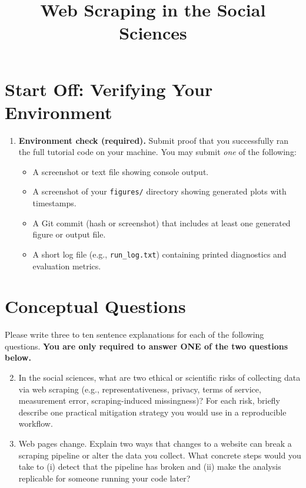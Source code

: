 \documentclass[11pt]{article}
\title{ Web Scraping in the Social Sciences}
\author{ }
\date{ }
\begin{document}
\maketitle

\section*{Start Off: Verifying Your Environment}

\begin{enumerate}
\item \textbf{Environment check (required).}  
Submit proof that you successfully ran the full tutorial code on your machine. You may submit \emph{one} of the following:
\begin{itemize}
  \item A screenshot or text file showing console output.
  \item A screenshot of your \texttt{figures/} directory showing generated plots with timestamps.
  \item A Git commit (hash or screenshot) that includes at least one generated figure or output file.
  \item A short log file (e.g., \texttt{run\_log.txt}) containing printed diagnostics and evaluation metrics.
\end{itemize}
\end{enumerate}

\section*{Conceptual Questions}
Please write three to ten sentence explanations for each of the following questions. \textbf{You are only required to answer ONE of the two questions below.} \bigskip
 
\begin{enumerate}
\setcounter{enumi}{1}

\item In the social sciences, what are two ethical or scientific risks of collecting data via web scraping (e.g., representativeness, privacy, terms of service, measurement error, scraping-induced missingness)? For each risk, briefly describe one practical mitigation strategy you would use in a reproducible workflow.

\item Web pages change. Explain two ways that changes to a website can break a scraping pipeline or alter the data you collect. What concrete steps would you take to (i) detect that the pipeline has broken and (ii) make the analysis replicable for someone running your code later?

  \end{enumerate}
\end{document}

